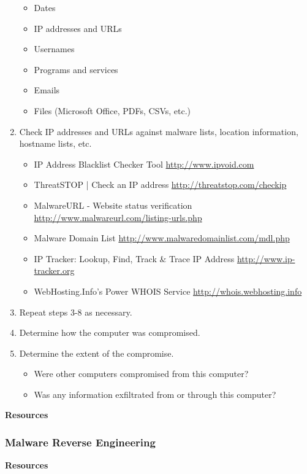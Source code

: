\begin{enumerate}
\begin{itemize}
\item Dates
\item IP addresses and URLs
\item Usernames
\item Programs and services
\item Emails
\item Files (Microsoft Office, PDFs, CSVs, etc.)
\end{itemize}
\item Check IP addresses and URLs against malware lists, location information, hostname lists, etc.
\begin{itemize}
\item IP Address Blacklist Checker Tool \url{http://www.ipvoid.com} 
\item ThreatSTOP | Check an IP address \url{http://threatstop.com/checkip}
\item MalwareURL - Website status verification \url{http://www.malwareurl.com/listing-urls.php}
\item Malware Domain List \url{http://www.malwaredomainlist.com/mdl.php}
\item IP Tracker: Lookup, Find, Track \& Trace IP Address \url{http://www.ip-tracker.org}
\item WebHosting.Info's Power WHOIS Service \url{http://whois.webhosting.info}
\end{itemize}
\item Repeat steps 3-8 as necessary.
\item Determine how the computer was compromised.
\item Determine the extent of the compromise.
\begin{itemize}
\item Were other computers compromised from this computer?
\item Was any information exfiltrated from or through this computer?
\end{itemize}
\end{enumerate}
\textbf{Resources}
\begin{enumerate}
\end{enumerate}
\subsubsection{Malware Reverse Engineering}
\textbf{Resources}
\begin{enumerate}
\end{enumerate}